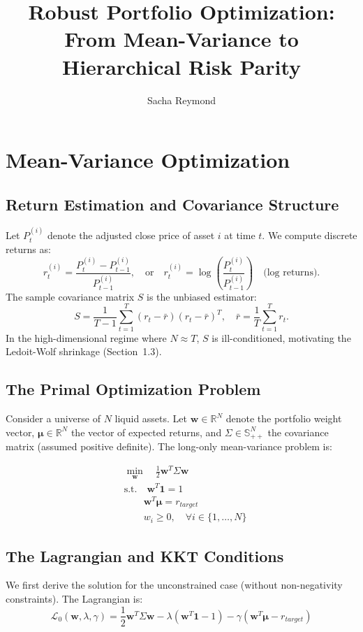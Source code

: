\documentclass[11pt,a4paper]{article}
\title{Robust Portfolio Optimization: From Mean-Variance to Hierarchical Risk Parity}
\author{Sacha Reymond}
\date{}
\begin{document}
\maketitle

\section{Mean-Variance Optimization}
\subsection{Return Estimation and Covariance Structure}
Let $P_t^{(i)}$ denote the adjusted close price of asset $i$ at time $t$. We compute discrete returns as:
\begin{equation}
r_t^{(i)} = \frac{P_t^{(i)} - P_{t-1}^{(i)}}{P_{t-1}^{(i)}}, \quad \text{or} \quad r_t^{(i)} = \log\left(\frac{P_t^{(i)}}{P_{t-1}^{(i)}}\right) \quad \text{(log returns)}.
\end{equation}
The sample covariance matrix $S$ is the unbiased estimator:
\begin{equation}
S = \frac{1}{T-1} \sum_{t=1}^T (r_t - \bar{r})(r_t - \bar{r})^T, \quad \bar{r} = \frac{1}{T} \sum_{t=1}^T r_t.
\end{equation}
In the high-dimensional regime where $N \approx T$, $S$ is ill-conditioned, motivating the Ledoit-Wolf shrinkage (Section~1.3).
\subsection{The Primal Optimization Problem}
Consider a universe of $N$ liquid assets. Let $\mathbf{w} \in \mathbb{R}^N$ denote the portfolio weight vector, $\bm{\mu} \in \mathbb{R}^N$ the vector of expected returns, and $\Sigma \in \mathbb{S}_{++}^N$ the covariance matrix (assumed positive definite). The long-only mean-variance problem is:

\begin{equation}
\begin{aligned}
& \min_{\mathbf{w}} \quad \frac{1}{2} \mathbf{w}^T \Sigma \mathbf{w} \\
& \text{s.t.} \quad \mathbf{w}^T \mathbf{1} = 1 \\
& \quad \quad \mathbf{w}^T \bm{\mu} = r_{target} \\
& \quad \quad w_i \geq 0, \quad \forall i \in \{1, \dots, N\}
\end{aligned}
\end{equation}

\subsection{The Lagrangian and KKT Conditions}
We first derive the solution for the unconstrained case (without non-negativity constraints). The Lagrangian is:
\begin{equation}
\mathcal{L}_0(\mathbf{w}, \lambda, \gamma) = \frac{1}{2} \mathbf{w}^T \Sigma \mathbf{w} - \lambda(\mathbf{w}^T \mathbf{1} - 1) - \gamma(\mathbf{w}^T \bm{\mu} - r_{target})
\end{equation}
\end{document}

